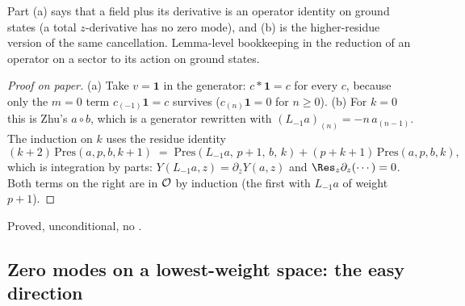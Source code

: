 \begin{physics}
Part (a) says that a field plus its derivative is an operator identity on ground states (a total $z$-derivative has no zero mode), and (b) is the higher-residue version of the same cancellation. Lemma-level bookkeeping in the reduction of an operator on a sector to its action on ground states.
\end{physics}
\begin{proof}[Proof on paper]
(a) Take $v=\mathbf 1$ in the generator: $c\ast\mathbf 1=c$ for every $c$, because only the $m=0$ term
$c_{(-1)}\mathbf 1=c$ survives ($c_{(n)}\mathbf 1=0$ for $n\ge0$).  (b) For $k=0$ this is Zhu's
$a\circ b$, which is a generator rewritten with $(L_{-1}a)_{(n)}=-n\,a_{(n-1)}$.  The induction on $k$
uses the residue identity
\begin{equation*}
  (k+2)\,\mathrm{Pres}(a,p,b,k+1)\;=\;\mathrm{Pres}(L_{-1}a,\,p+1,\,b,\,k)+(p+k+1)\,\mathrm{Pres}(a,p,b,k),
\end{equation*}
which is integration by parts: $Y(L_{-1}a,z)=\partial_zY(a,z)$ and $\Res_z\partial_z(\cdots)=0$.  Both terms
on the right are in $\mathcal{O}$ by induction (the first with $L_{-1}a$ of weight $p+1$).
\end{proof}
\begin{status}Proved, unconditional, no .\end{status}

\subsection{Zero modes on a lowest-weight space: the easy direction}

